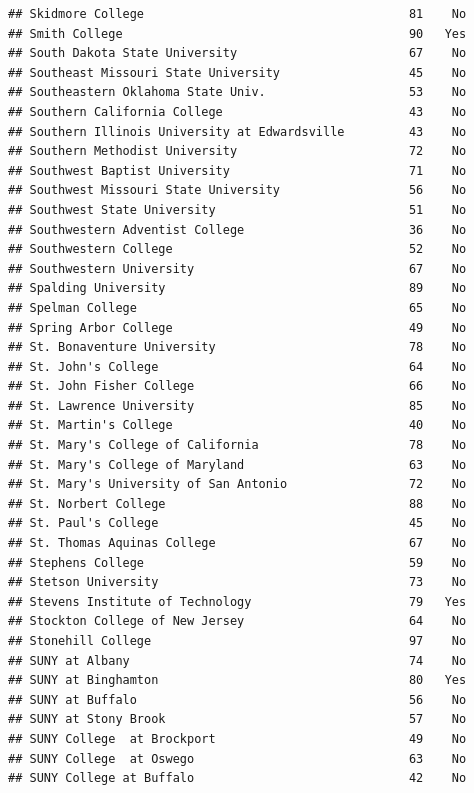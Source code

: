 \documentclass[
]{article}
\begin{document}
\begin{verbatim}
## Skidmore College                                     81    No
## Smith College                                        90   Yes
## South Dakota State University                        67    No
## Southeast Missouri State University                  45    No
## Southeastern Oklahoma State Univ.                    53    No
## Southern California College                          43    No
## Southern Illinois University at Edwardsville         43    No
## Southern Methodist University                        72    No
## Southwest Baptist University                         71    No
## Southwest Missouri State University                  56    No
## Southwest State University                           51    No
## Southwestern Adventist College                       36    No
## Southwestern College                                 52    No
## Southwestern University                              67    No
## Spalding University                                  89    No
## Spelman College                                      65    No
## Spring Arbor College                                 49    No
## St. Bonaventure University                           78    No
## St. John's College                                   64    No
## St. John Fisher College                              66    No
## St. Lawrence University                              85    No
## St. Martin's College                                 40    No
## St. Mary's College of California                     78    No
## St. Mary's College of Maryland                       63    No
## St. Mary's University of San Antonio                 72    No
## St. Norbert College                                  88    No
## St. Paul's College                                   45    No
## St. Thomas Aquinas College                           67    No
## Stephens College                                     59    No
## Stetson University                                   73    No
## Stevens Institute of Technology                      79   Yes
## Stockton College of New Jersey                       64    No
## Stonehill College                                    97    No
## SUNY at Albany                                       74    No
## SUNY at Binghamton                                   80   Yes
## SUNY at Buffalo                                      56    No
## SUNY at Stony Brook                                  57    No
## SUNY College  at Brockport                           49    No
## SUNY College  at Oswego                              63    No
## SUNY College at Buffalo                              42    No

\end{verbatim}
\end{document}
